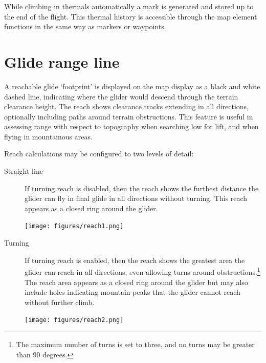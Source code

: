While climbing in thermals automatically a mark is generated and stored up
to the end of the flight. This thermal history is accessible through the map
element functions in the same way as markers or waypoints.


\section{Glide range line}\label{sec:reach}

A reachable glide `footprint' is displayed on the map display as a
black and white dashed line, indicating where the glider would descend
through the terrain clearance height.  The reach shows clearance
tracks extending in all directions, optionally including paths around
terrain obstructions.  This feature is useful in assessing range with
respect to topography when searching low for lift, and when flying in
mountainous areas.

Reach calculations may be configured  to two levels of detail:
\begin{description}
\item[Straight line] If turning reach is disabled, then the reach shows the
 furthest distance the glider can fly in final glide in all directions without
 turning.  This reach appears as a closed ring around the glider.

\begin{center}
\texttt{[image: figures/reach1.png]}
\end{center}

\item[Turning] If turning reach is enabled, then the reach shows the
  greatest area the glider can reach in all directions, even allowing
  turns around obstructions.\footnote{The maximum number of turns is
    set to three, and no turns may be greater than 90 degrees.}  The
  reach area appears as a closed ring around the glider but may also
  include holes indicating mountain peaks that the glider cannot reach
  without further climb.

\begin{center}
\texttt{[image: figures/reach2.png]}
\end{center}

\end{description}

